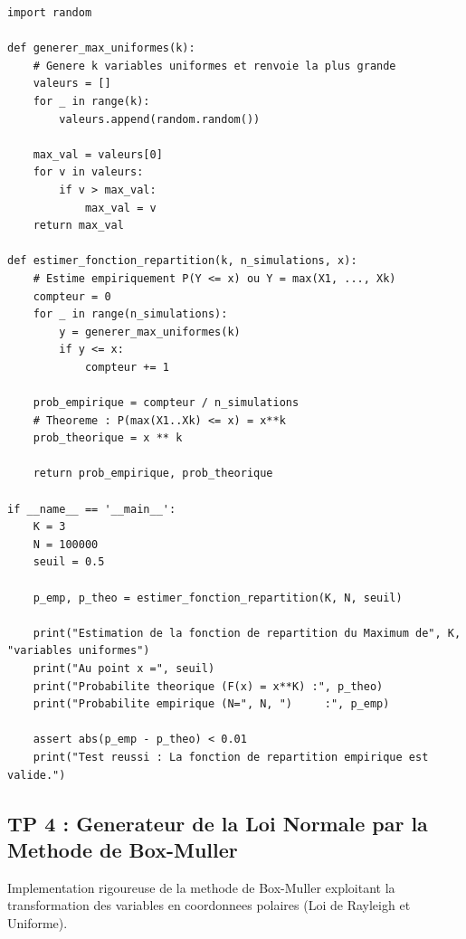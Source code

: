 \documentclass[11pt,a4paper]{article}
\begin{document}
\begin{lstlisting}
import random

def generer_max_uniformes(k):
    # Genere k variables uniformes et renvoie la plus grande
    valeurs = []
    for _ in range(k):
        valeurs.append(random.random())

    max_val = valeurs[0]
    for v in valeurs:
        if v > max_val:
            max_val = v
    return max_val

def estimer_fonction_repartition(k, n_simulations, x):
    # Estime empiriquement P(Y <= x) ou Y = max(X1, ..., Xk)
    compteur = 0
    for _ in range(n_simulations):
        y = generer_max_uniformes(k)
        if y <= x:
            compteur += 1

    prob_empirique = compteur / n_simulations
    # Theoreme : P(max(X1..Xk) <= x) = x**k
    prob_theorique = x ** k

    return prob_empirique, prob_theorique

if __name__ == '__main__':
    K = 3
    N = 100000
    seuil = 0.5

    p_emp, p_theo = estimer_fonction_repartition(K, N, seuil)

    print("Estimation de la fonction de repartition du Maximum de", K, "variables uniformes")
    print("Au point x =", seuil)
    print("Probabilite theorique (F(x) = x**K) :", p_theo)
    print("Probabilite empirique (N=", N, ")     :", p_emp)

    assert abs(p_emp - p_theo) < 0.01
    print("Test reussi : La fonction de repartition empirique est valide.")

\end{lstlisting}


\subsection*{TP 4 : Generateur de la Loi Normale par la Methode de Box-Muller}

Implementation rigoureuse de la methode de Box-Muller exploitant la transformation des variables en coordonnees polaires (Loi de Rayleigh et Uniforme).
\end{document}
